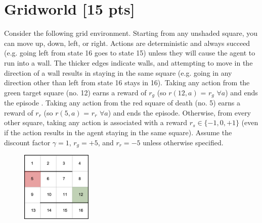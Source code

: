 
\section{Gridworld [15 pts]}

Consider the following grid environment. Starting from any unshaded square, you can move up, down, left, or right. Actions are deterministic and always succeed (e.g. going left from state 16 goes to state 15) unless they will cause the agent to run into a wall. The thicker edges indicate walls, and attempting to move in the direction of a wall results in staying in the same square (e.g. going in any direction other than left from state 16 stays in 16). Taking any action from the green target square (no. 12) earns a reward of $r_g$ (so $r(12, a)$ = $r_g$ $\forall a$) and ends the episode . Taking any action from the red square of death (no. 5) earns a reward of $r_r$ (so $r(5, a)$ = $r_r$ $\forall a$) and ends the episode. Otherwise, from every other square, taking any action is associated with a reward $r_s \in \{-1, 0, +1\}$ (even if the action results in the agent staying in the same square). Assume the discount factor $\gamma = 1$, $r_g = +5$, and $r_r = -5$ unless otherwise specified.

\begin{figure}[h]
  \centering
    \includegraphics[width=0.3\textwidth]{tex/grid.png}
  	\label{fig:grid}
\end{figure}

